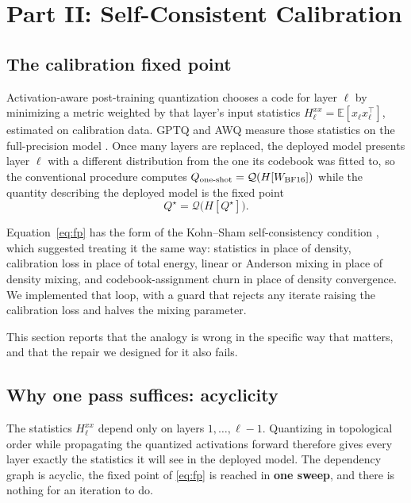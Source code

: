 \section{Part II: Self-Consistent Calibration}
\label{sec:part2}

\subsection{The calibration fixed point}

Activation-aware post-training quantization chooses a code for layer $\ell$ by
minimizing a metric weighted by that layer's input statistics
$H^{xx}_\ell=\mathbb E[x_\ell x_\ell^\top]$, estimated on calibration data.
GPTQ and AWQ measure those statistics on the full-precision model
\cite{gptq,awq}. Once many layers are replaced, the deployed model presents
layer $\ell$ with a different distribution from the one its codebook was fitted
to, so the conventional procedure computes
$Q_{\text{one-shot}}=\mathcal Q(H[W_{\rm BF16}])$ while the quantity describing
the deployed model is the fixed point
\begin{equation}
 Q^\star=\mathcal Q\bigl(H[Q^\star]\bigr).
 \label{eq:fp}
\end{equation}

Equation~\eqref{eq:fp} has the form of the Kohn--Sham self-consistency condition
\cite{kohnsham}, which suggested treating it the same way: statistics in place
of density, calibration loss in place of total energy, linear or Anderson
mixing \cite{anderson,pulay} in place of density mixing, and codebook-assignment
churn in place of density convergence. We implemented that loop, with a guard
that rejects any iterate raising the calibration loss and halves the mixing
parameter.

This section reports that the analogy is wrong in the specific way that matters,
and that the repair we designed for it also fails.

\subsection{Why one pass suffices: acyclicity}
\label{sec:acyclic}

The statistics $H^{xx}_\ell$ depend only on layers $1,\dots,\ell-1$. Quantizing
in topological order while propagating the quantized activations forward
therefore gives every layer exactly the statistics it will see in the deployed
model. The dependency graph is acyclic, the fixed point of \eqref{eq:fp} is
reached in \textbf{one sweep}, and there is nothing for an iteration to do.

